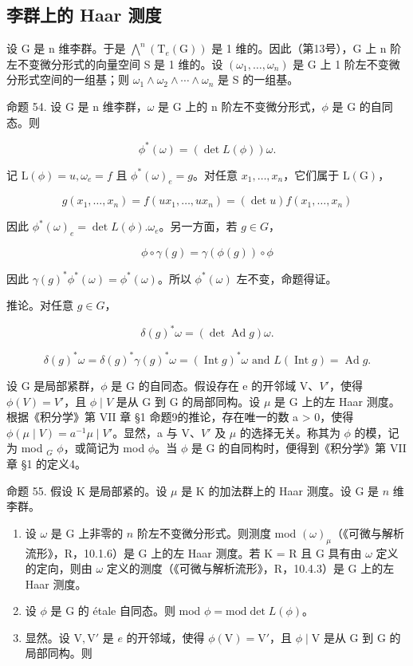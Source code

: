 \subsection{李群上的 Haar 测度}

设 G 是 n 维李群。于是 \(\bigwedge^{n}(\mathrm{T}_{e}(\mathrm{G}))\) 是 1 维的。因此（第13号），G 上 n 阶左不变微分形式的向量空间 S 是 1 维的。设 \((\omega_{1},\ldots,\omega_{n})\) 是 G 上 1 阶左不变微分形式空间的一组基；则 \(\omega_{1}\wedge\omega_{2}\wedge\cdots\wedge\omega_{n}\) 是 S 的一组基。

命题 54. 设 G 是 n 维李群，\(\omega\) 是 G 上的 n 阶左不变微分形式，\(\phi\) 是 G 的自同态。则

\[
\phi^ {*} (\omega) = (\det L (\phi)) \omega .
\]

记 \(\mathrm{L}(\phi) = u, \omega_e = f\) 且 \(\phi^*(\omega)_e = g\)。对任意 \(x_1, \ldots, x_n\)，它们属于 \(\mathrm{L}(\mathrm{G})\)，

\[
g (x _ {1}, \dots , x _ {n}) = f (u x _ {1}, \dots , u x _ {n}) = (\det u) f (x _ {1}, \dots , x _ {n})
\]

因此 \(\phi^{*}(\omega)_{e} = \det L(\phi). \omega_{e}\)。另一方面，若 \(g \in G\)，

\[
\phi \circ \gamma (g) = \gamma (\phi (g)) \circ \phi
\]

因此 \(\gamma(g)^{*}\phi^{*}(\omega)=\phi^{*}(\omega)\)。所以 \(\phi^{*}(\omega)\) 左不变，命题得证。

推论。对任意 \(g \in G\)，

\[
\delta (g) ^ {*} \omega = (\det \operatorname{Ad} g) \omega .
\]

\[
\delta (g) ^ {*} \omega = \delta (g) ^ {*} \gamma (g) ^ {*} \omega = (\operatorname{Int} g) ^ {*} \omega \text {   and   } L (\operatorname{Int} g) = \operatorname{Ad} g.
\]

设 G 是局部紧群，\(\phi\) 是 G 的自同态。假设存在 e 的开邻域 V、\(V'\)，使得 \(\phi(V) = V'\)，且 \(\phi \mid V\) 是从 G 到 G 的局部同构。设 \(\mu\) 是 G 上的左 Haar 测度。根据《积分学》第 VII 章 §1 命题9的推论，存在唯一的数 a \textgreater{} 0，使得 \(\phi(\mu \mid V) = a^{-1}\mu \mid V'\)。显然，a 与 V、\(V'\) 及 \(\mu\) 的选择无关。称其为 \(\phi\) 的模，记为 mod \(_{G}\) \(\phi\)，或简记为 mod \(\phi\)。当 \(\phi\) 是 G 的自同构时，便得到《积分学》第 VII 章 §1 的定义4。

命题 55. 假设 K 是局部紧的。设 \(\mu\) 是 K 的加法群上的 Haar 测度。设 G 是 \(n\) 维李群。

\begin{enumerate}
\def\labelenumi{(\roman{enumi})}
\item
  设 \(\omega\) 是 G 上非零的 \(n\) 阶左不变微分形式。则测度 mod \((\omega)_{\mu}\)（《可微与解析流形》，R，10.1.6）是 G 上的左 Haar 测度。若 K = R 且 G 具有由 \(\omega\) 定义的定向，则由 \(\omega\) 定义的测度（《可微与解析流形》，R，10.4.3）是 G 上的左 Haar 测度。
\item
  设 \(\phi\) 是 G 的 étale 自同态。则 mod \(\phi = \text{mod}\det L(\phi)\)。
\item
  显然。设 \(\mathrm{V}, \mathrm{V}'\) 是 \(e\) 的开邻域，使得 \(\phi(\mathrm{V}) = \mathrm{V}'\)，且 \(\phi \mid \mathrm{V}\) 是从 \(\mathrm{G}\) 到 \(\mathrm{G}\) 的局部同构。则
\end{enumerate}


